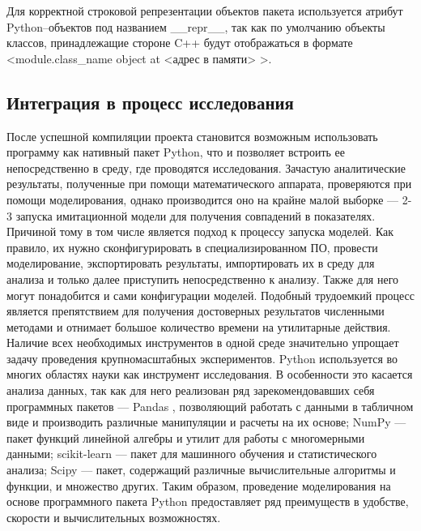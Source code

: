 Для корректной строковой репрезентации объектов пакета используется атрибут Python--объектов под названием \_\_repr\_\_, так как по умолчанию объекты классов, принадлежащие стороне C++ будут отображаться в формате\\ <module.class\_name object at <адрес в памяти> >.

\subsection{Интеграция в процесс исследования}
После успешной компиляции проекта становится возможным использовать программу как нативный пакет Python, что и позволяет встроить ее непосредственно в среду, где проводятся исследования. Зачастую аналитические результаты, полученные при помощи математического аппарата, проверяются при помощи моделирования, однако производится оно на крайне малой выборке --- 2-3 запуска имитационной модели для получения совпадений в показателях. Причиной тому в том числе является подход к процессу запуска моделей. Как правило, их нужно сконфигурировать в специализированном ПО, провести моделирование, экспортировать результаты, импортировать их в среду для анализа и только далее приступить непосредственно к анализу. Также для него могут понадобится и сами конфигурации моделей. Подобный трудоемкий процесс является препятствием для получения достоверных результатов численными методами и отнимает большое количество времени на утилитарные действия. Наличие всех необходимых инструментов в одной среде значительно упрощает задачу проведения крупномасштабных экспериментов. Python используется \cite{mckinney2012python} во многих областях науки как инструмент исследования. В особенности это касается анализа данных, так как для него реализован ряд зарекомендовавших себя программных пакетов --- Pandas \cite{mckinney2011pandas}, позволяющий работать с данными в табличном виде и производить различные манипуляции и расчеты на их основе; NumPy \cite{numpy} --- пакет функций линейной алгебры и утилит для работы с многомерными данными; scikit-learn \cite{hackeling2017mastering} --- пакет для машинного обучения и статистического анализа; Scipy \cite{virtanen2020scipy} --- пакет, содержащий различные вычислительные алгоритмы и функции, и множество других. Таким образом, проведение моделирования на основе программного пакета Python предоставляет ряд преимуществ в удобстве, скорости и вычислительных возможностях.

